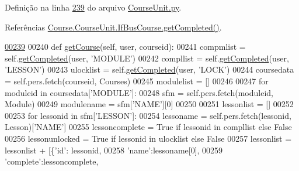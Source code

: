 Definição na linha \hyperlink{CourseUnit_8py_source_l00239}{239} do arquivo \hyperlink{CourseUnit_8py_source}{Course\-Unit.\-py}.



Referências \hyperlink{classCourse_1_1CourseUnit_1_1IfBusCourse_ae83d657f3a281dd8a9ade3e7a9db0659}{Course.\-Course\-Unit.\-If\-Bus\-Course.\-get\-Completed()}.


\begin{DoxyCode}
\hypertarget{classCourse_1_1CourseUnit_1_1BusCourse_l00239}{}\hyperlink{classCourse_1_1CourseUnit_1_1BusCourse_ac7306e270597d7aac641d956f8e3f31f}{00239} 
00240     \textcolor{keyword}{def }\hyperlink{classCourse_1_1CourseUnit_1_1BusCourse_ac7306e270597d7aac641d956f8e3f31f}{getCourse}(self, user, courseid):
00241         compmlist = self.\hyperlink{classCourse_1_1CourseUnit_1_1IfBusCourse_ae83d657f3a281dd8a9ade3e7a9db0659}{getCompleted}(user, \textcolor{stringliteral}{'MODULE'})
00242         compllist = self.\hyperlink{classCourse_1_1CourseUnit_1_1IfBusCourse_ae83d657f3a281dd8a9ade3e7a9db0659}{getCompleted}(user, \textcolor{stringliteral}{'LESSON'})
00243         ulocklist = self.\hyperlink{classCourse_1_1CourseUnit_1_1IfBusCourse_ae83d657f3a281dd8a9ade3e7a9db0659}{getCompleted}(user, \textcolor{stringliteral}{'LOCK'})
00244         coursedata = self.pers.fetch(courseid, Courses)
00245         modulelist = []
00246         
00247         \textcolor{keywordflow}{for} moduleid \textcolor{keywordflow}{in} coursedata[\textcolor{stringliteral}{'MODULE'}]:
00248             sfm = self.pers.fetch(moduleid, Module)
00249             modulename = sfm[\textcolor{stringliteral}{'NAME'}][0]
00250 
00251             lessonlist = []
00252 
00253             \textcolor{keywordflow}{for} lessonid \textcolor{keywordflow}{in} sfm[\textcolor{stringliteral}{'LESSON'}]:
00254                 lessoname = self.pers.fetch(lessonid, Lesson)[\textcolor{stringliteral}{'NAME'}]
00255                 lessoncomplete = \textcolor{keyword}{True} \textcolor{keywordflow}{if} lessonid \textcolor{keywordflow}{in} compllist \textcolor{keywordflow}{else} \textcolor{keyword}{False}
00256                 lessonunlocked = \textcolor{keyword}{True} \textcolor{keywordflow}{if} lessonid \textcolor{keywordflow}{in} ulocklist \textcolor{keywordflow}{else} \textcolor{keyword}{False}
00257                 lessonlist = lessonlist + [\{\textcolor{stringliteral}{'id'}: lessonid,
00258                                             \textcolor{stringliteral}{'name'}:lessoname[0],
00259                                             \textcolor{stringliteral}{'complete'}:lessoncomplete,

\end{DoxyCode}
